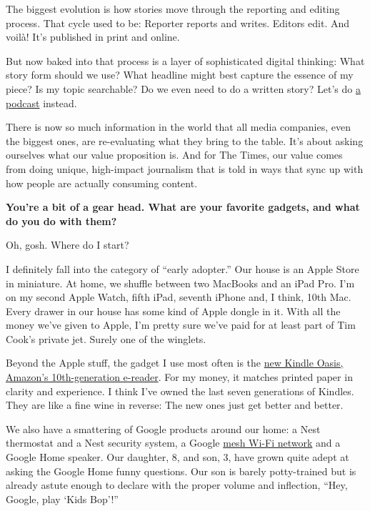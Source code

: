 The biggest evolution is how stories move through the reporting and
editing process. That cycle used to be: Reporter reports and writes.
Editors edit. And voilà! It's published in print and online.

But now baked into that process is a layer of sophisticated digital
thinking: What story form should we use? What headline might best
capture the essence of my piece? Is my topic searchable? Do we even need
to do a written story? Let's do
\href{https://www.nytimes3xbfgragh.onion/column/the-daily}{a podcast}
instead.

There is now so much information in the world that all media companies,
even the biggest ones, are re-evaluating what they bring to the table.
It's about asking ourselves what our value proposition is. And for The
Times, our value comes from doing unique, high-impact journalism that is
told in ways that sync up with how people are actually consuming
content.

\textbf{You're a bit of a gear head. What are your favorite gadgets, and
what do you do with them?}

Oh, gosh. Where do I start?

I definitely fall into the category of ``early adopter.'' Our house is
an Apple Store in miniature. At home, we shuffle between two MacBooks
and an iPad Pro. I'm on my second Apple Watch, fifth iPad, seventh
iPhone and, I think, 10th Mac. Every drawer in our house has some kind
of Apple dongle in it. With all the money we've given to Apple, I'm
pretty sure we've paid for at least part of Tim Cook's private jet.
Surely one of the winglets.

Beyond the Apple stuff, the gadget I use most often is the
\href{https://www.nytimes3xbfgragh.onion/2019/08/01/technology/personaltech/amazon-kindle-oasis-review-e-reader.html}{new
Kindle Oasis, Amazon's 10th-generation e-reader}. For my money, it
matches printed paper in clarity and experience. I think I've owned the
last seven generations of Kindles. They are like a fine wine in reverse:
The new ones just get better and better.

We also have a smattering of Google products around our home: a Nest
thermostat and a Nest security system, a Google
\href{https://www.nytimes3xbfgragh.onion/2017/04/26/technology/personaltech/mesh-network-vs-router.html}{mesh
Wi-Fi network} and a Google Home speaker. Our daughter, 8, and son, 3,
have grown quite adept at asking the Google Home funny questions. Our
son is barely potty-trained but is already astute enough to declare with
the proper volume and inflection, ``Hey, Google, play `Kids Bop'!''

